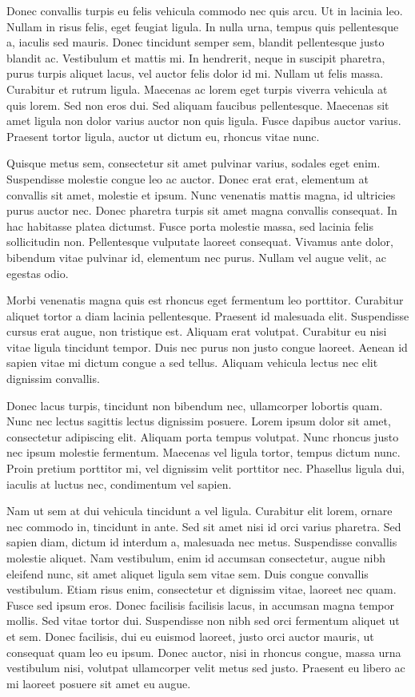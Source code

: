 Donec convallis turpis eu felis vehicula commodo nec quis arcu. Ut in lacinia leo. Nullam in risus felis, eget feugiat ligula. In nulla urna, tempus quis pellentesque a, iaculis sed mauris. Donec tincidunt semper sem, blandit pellentesque justo blandit ac. Vestibulum et mattis mi. In hendrerit, neque in suscipit pharetra, purus turpis aliquet lacus, vel auctor felis dolor id mi. Nullam ut felis massa. Curabitur et rutrum ligula. Maecenas ac lorem eget turpis viverra vehicula at quis lorem. Sed non eros dui. Sed aliquam faucibus pellentesque. Maecenas sit amet ligula non dolor varius auctor non quis ligula. Fusce dapibus auctor varius. Praesent tortor ligula, auctor ut dictum eu, rhoncus vitae nunc.

Quisque metus sem, consectetur sit amet pulvinar varius, sodales eget enim. Suspendisse molestie congue leo ac auctor. Donec erat erat, elementum at convallis sit amet, molestie et ipsum. Nunc venenatis mattis magna, id ultricies purus auctor nec. Donec pharetra turpis sit amet magna convallis consequat. In hac habitasse platea dictumst. Fusce porta molestie massa, sed lacinia felis sollicitudin non. Pellentesque vulputate laoreet consequat. Vivamus ante dolor, bibendum vitae pulvinar id, elementum nec purus. Nullam vel augue velit, ac egestas odio.

Morbi venenatis magna quis est rhoncus eget fermentum leo porttitor. Curabitur aliquet tortor a diam lacinia pellentesque. Praesent id malesuada elit. Suspendisse cursus erat augue, non tristique est. Aliquam erat volutpat. Curabitur eu nisi vitae ligula tincidunt tempor. Duis nec purus non justo congue laoreet. Aenean id sapien vitae mi dictum congue a sed tellus. Aliquam vehicula lectus nec elit dignissim convallis.

Donec lacus turpis, tincidunt non bibendum nec, ullamcorper lobortis quam. Nunc nec lectus sagittis lectus dignissim posuere. Lorem ipsum dolor sit amet, consectetur adipiscing elit. Aliquam porta tempus volutpat. Nunc rhoncus justo nec ipsum molestie fermentum. Maecenas vel ligula tortor, tempus dictum nunc. Proin pretium porttitor mi, vel dignissim velit porttitor nec. Phasellus ligula dui, iaculis at luctus nec, condimentum vel sapien.

Nam ut sem at dui vehicula tincidunt a vel ligula. Curabitur elit lorem, ornare nec commodo in, tincidunt in ante. Sed sit amet nisi id orci varius pharetra. Sed sapien diam, dictum id interdum a, malesuada nec metus. Suspendisse convallis molestie aliquet. Nam vestibulum, enim id accumsan consectetur, augue nibh eleifend nunc, sit amet aliquet ligula sem vitae sem. Duis congue convallis vestibulum. Etiam risus enim, consectetur et dignissim vitae, laoreet nec quam. Fusce sed ipsum eros. Donec facilisis facilisis lacus, in accumsan magna tempor mollis. Sed vitae tortor dui. Suspendisse non nibh sed orci fermentum aliquet ut et sem. Donec facilisis, dui eu euismod laoreet, justo orci auctor mauris, ut consequat quam leo eu ipsum. Donec auctor, nisi in rhoncus congue, massa urna vestibulum nisi, volutpat ullamcorper velit metus sed justo. Praesent eu libero ac mi laoreet posuere sit amet eu augue.

